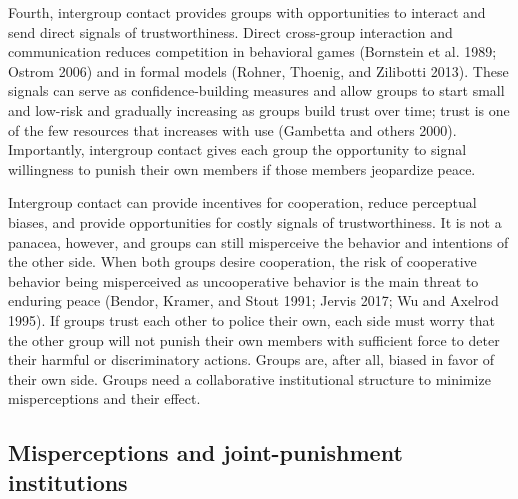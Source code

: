 \documentclass[11pt]{article}
\begin{document}
Fourth, intergroup contact provides groups with opportunities to
interact and send direct signals of trustworthiness. Direct cross-group
interaction and communication reduces competition in behavioral games
(Bornstein et al. 1989; Ostrom 2006) and in formal models (Rohner,
Thoenig, and Zilibotti 2013). These signals can serve as
confidence-building measures and allow groups to start small and
low-risk and gradually increasing as groups build trust over time; trust
is one of the few resources that increases with use (Gambetta and others
2000). Importantly, intergroup contact gives each group the opportunity
to signal willingness to punish their own members if those members
jeopardize peace.

Intergroup contact can provide incentives for cooperation, reduce
perceptual biases, and provide opportunities for costly signals of
trustworthiness. It is not a panacea, however, and groups can still
misperceive the behavior and intentions of the other side. When both
groups desire cooperation, the risk of cooperative behavior being
misperceived as uncooperative behavior is the main threat to enduring
peace (Bendor, Kramer, and Stout 1991; Jervis 2017; Wu and Axelrod
1995). If groups trust each other to police their own, each side must
worry that the other group will not punish their own members with
sufficient force to deter their harmful or discriminatory actions.
Groups are, after all, biased in favor of their own side. Groups need a
collaborative institutional structure to minimize misperceptions and
their effect.

\hypertarget{misperceptions-and-joint-punishment-institutions}{%
\subsection{Misperceptions and joint-punishment
institutions}\label{misperceptions-and-joint-punishment-institutions}}
\end{document}
